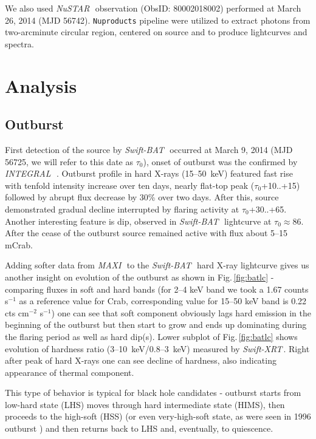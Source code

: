 \documentclass[a4paper,fleqn,usenatbib]{mnras}
\def\swiftx{{\em Swift-XRT\,}}
\def\swiftb{{\em Swift-BAT\,}}
\def\nustar{{\em NuSTAR\,}}
\def\integral{{\em INTEGRAL\,}}
\def\maxi{{\em MAXI\,}}
\begin{document}
We also used \nustar\, observation (ObsID: 80002018002) performed at March 26, 2014 (MJD 56742).  {\texttt{Nuproducts}} pipeline were utilized to extract photons  from two-arcminute circular region, centered on source and to produce lightcurves and spectra.

\section{Analysis}
\subsection{Outburst}
First detection of the source by \swiftb\, \citep{krimm14_atel} occurred at March 9, 2014 (MJD 56725, we will refer to this date as $\tau_{0}$), onset of outburst was the confirmed by \integral\, \citep{filippova14}. Outburst profile in hard X-rays (15--50~keV) featured fast rise with tenfold intensity increase over ten days, nearly flat-top peak ($\tau_{0}$+10..+15) followed by abrupt flux decrease by 30\% over two days. After this, source demonstrated gradual decline interrupted by flaring activity at $\tau_{0}$+30..+65. Another interesting feature is dip, observed in \swiftb\, lightcurve at $\tau_{0} \approx 86$. After the cease of the outburst source remained active with flux about 5--15 mCrab. 

Adding softer data from \maxi\, to the \swiftb\, hard X-ray lightcurve gives us another insight on evolution of the outburst as shown in Fig.\,\ref{fig:batlc} - comparing fluxes in soft and hard bands (for 2--4 keV band we took a 1.67 counts s$^{-1}$ as a reference value for Crab, corresponding value for 15--50 keV band is 0.22 cts cm$^{-2}$ s$^{-1}$) one can see that soft component obviously lags hard emission in the beginning of the outburst but then start to grow and ends up dominating during the flaring period as well as hard dip(s). Lower subplot of Fig.\,\ref{fig:batlc} shows evolution of hardness ratio (3--10~keV/0.8--3~keV) measured by \swiftx. Right after peak of hard X-rays one can see decline of hardness, also indicating appearance of thermal component.

This type of behavior is typical for black hole candidates \citep[BHC, see e.g.][]{grebenev97, tanaka96, remillard06, belloni10} - outburst starts from low-hard state (LHS) moves through hard intermediate state (HIMS), then proceeds to the high-soft (HSS) (or even very-high-soft state, as were seen in 1996 outburst \citep{borozdin00}) and then returns back to LHS and, eventually, to quiescence.
\end{document}
